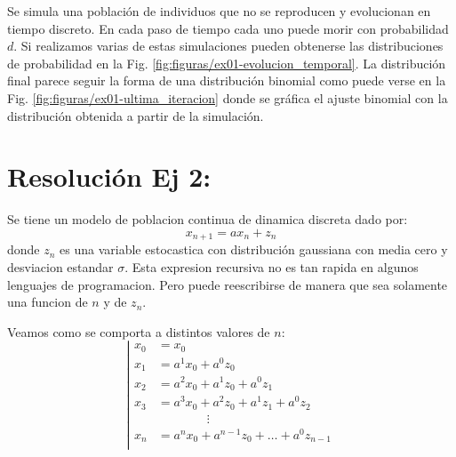 \documentclass[twocolumn,aps,prl]{revtex4-1}
\newcommand*\sepline{%
  \begin{center}
    \rule[1ex]{.5\textwidth}{.5pt}
  \end{center}}
\begin{document}
Se simula una población de individuos que no se reproducen y evolucionan en tiempo discreto. En cada paso de tiempo cada uno puede morir con probabilidad $d$. Si realizamos varias de estas simulaciones pueden obtenerse las distribuciones de probabilidad en la Fig. \ref{fig:figuras/ex01-evolucion_temporal}. La distribución final parece seguir la forma de una distribución binomial como puede verse en la Fig. \ref{fig:figuras/ex01-ultima_iteracion} donde se gráfica el ajuste binomial con la distribución obtenida a partir de la simulación.

\section{Resolución Ej 2:}


Se tiene un modelo de poblacion continua de dinamica discreta dado por:
\begin{equation}\label{ec:map01}
  x_{n+1} = a x_n + z_n
\end{equation}
donde $z_n$ es una variable estocastica con distribución gaussiana con media cero y desviacion estandar $\sigma$. Esta expresion recursiva no es tan rapida en algunos lenguajes de programacion. Pero puede reescribirse de manera que sea solamente una funcion de $n$ y de $z_n$.

Veamos como se comporta a distintos valores de $n$:
$$\left\vert
\begin{aligned}
  x_0 &=     x_0 \\
  x_1 &= a^1 x_0 + a^0 z_0 \\
  x_2 &= a^2 x_0 + a^1 z_0 + a^0 z_1 \\
  x_3 &= a^3 x_0 + a^2 z_0 + a^1 z_1 + a^0 z_2\\
      & \qquad \qquad \vdots \\
  x_n &= a^n x_0 + a^{n-1} z_0 + \ldots + a^0 z_{n-1}\\
\end{aligned}\right.
$$
\end{document}
